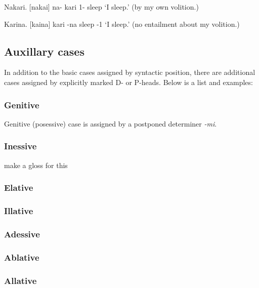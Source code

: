 		\begin{example}
		\label{ex:case_erg}
			Nakari. [naka\R i]
			\gll na- kari
			1- sleep
			\glt `I sleep.' (by my own volition.)
			\glend
		\end{example}

		\begin{example}
		\label{ex:case_abs}
			Karina. [ka\R ina]
			\gll kari -na
			sleep -1
			\glt `I sleep.' (no entailment about my volition.)
			\glend
		\end{example}
		\subsection{Auxillary cases}
			In addition to the basic cases assigned by syntactic position, there are additional cases assigned by explicitly marked D- or P-heads. Below is a list and examples:
				\subsubsection{Genitive}
					Genitive (posessive) case is assigned by a postponed determiner \emph{-mi}.
				\subsubsection{Inessive}
					make a gloss for this
				\subsubsection{Elative}
				\subsubsection{Illative}
				\subsubsection{Adessive}
				\subsubsection{Ablative}
				\subsubsection{Allative}

